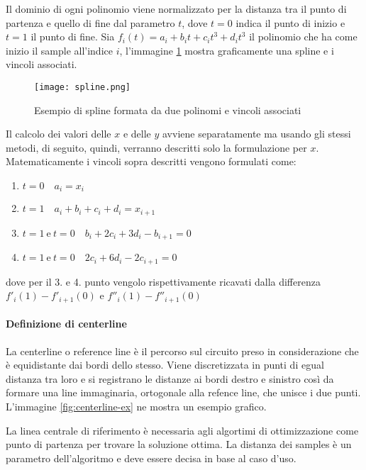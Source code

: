 Il dominio di ogni polinomio viene normalizzato per la distanza tra il punto di partenza e quello di fine
dal parametro $t$, dove $t = 0$ indica il punto di inizio e $t = 1$ il punto di fine.
Sia $f_i(t) = a_i + b_i t + c_i t^3 + d_i t^3$ il polinomio che ha come inizio il sample all'indice $i$,
l'immagine \ref{fig:spline} mostra graficamente una spline e i vincoli associati.

\begin{figure}
	\begin{center}
		\texttt{[image: spline.png]}
	\end{center}
	\caption{Esempio di spline formata da due polinomi e vincoli associati}\label{fig:spline}
\end{figure}

Il calcolo dei valori delle $x$ e delle $y$ avviene separatamente ma usando gli stessi metodi, di
seguito, quindi, verranno descritti solo la formulazione per $x$.
Matematicamente i vincoli sopra descritti vengono formulati come:
\begin{enumerate}
	\item $t = 0 \quad a_i = x_i$
	\item $t = 1 \quad a_i + b_i + c_i + d_i = x_{i+1}$
	\item $t = 1\ \text{e}\ t = 0 \quad b_i + 2 c_i + 3 d_i - b_{i+1} = 0$
	\item $t = 1\ \text{e}\ t = 0 \quad 2 c_i + 6 d_i - 2 c_{i+1} = 0$
\end{enumerate}
dove per il 3. e 4. punto vengolo rispettivamente ricavati dalla differenza \\
$f'_i(1) - f'_{i+1}(0)$ e $f''_i(1) - f''_{i+1}(0)$


\paragraph{Definizione di centerline}
\label{par:centerline}
La centerline o reference line è il percorso sul circuito preso in considerazione che è equidistante dai
bordi dello stesso. Viene discretizzata in punti di egual distanza tra loro e si registrano le distanze
ai bordi destro e sinistro così da formare una line immaginaria, ortogonale alla refence line, che unisce
i due punti. L'immagine \ref{fig:centerline-ex} ne mostra un esempio grafico.

La linea centrale di riferimento è necessaria agli algortimi di ottimizzazione come punto di partenza per
trovare la soluzione ottima.
La distanza dei samples è un parametro dell'algoritmo e deve essere decisa in base al caso d'uso.

